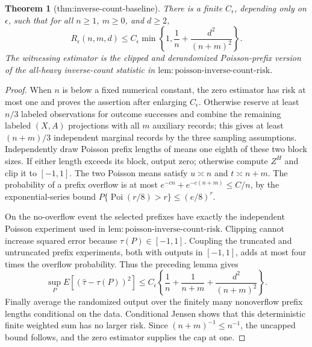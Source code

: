\documentclass{article}
\newtheorem{theorem}{Theorem}
\begin{document}
\begin{theorem}[thm:inverse-count-baseline]\label{thm:inverse-count-baseline}
There is a finite \(C_\epsilon\), depending only on \(\epsilon\), such that for all \(n\ge1\), \(m\ge0\), and \(d\ge2\),
\[
 R_\epsilon(n,m,d)\le C_\epsilon\min\!\left\{1,\frac1n+\frac{d^2}{(n+m)^2}\right\}.
\]
The witnessing estimator is the clipped and derandomized Poisson-prefix version of the all-heavy inverse-count statistic in \(\mathrm{lem:poisson\mbox{-}inverse\mbox{-}count\mbox{-}risk}\).
\end{theorem}
\begin{proof}
When \(n\) is below a fixed numerical constant, the zero estimator has risk at most one and proves the assertion after enlarging \(C_\epsilon\).  Otherwise reserve at least \(n/3\) labeled observations for outcome successes and combine the remaining labeled \((X,A)\) projections with all \(m\) auxiliary records; this gives at least \((n+m)/3\) independent marginal records by the three sampling assumptions.  Independently draw Poisson prefix lengths of means one eighth of these two block sizes.  If either length exceeds its block, output zero; otherwise compute \(Z^H\) and clip it to \([-1,1]\).  The two Poisson means satisfy \(u\asymp n\) and \(t\asymp n+m\).  The probability of a prefix overflow is at most \(e^{-c n}+e^{-c(n+m)}\le C/n\), by the exponential-series bound \(P\{\operatorname{Poi}(r/8)>r\}\le(e/8)^{r}\).

On the no-overflow event the selected prefixes have exactly the independent Poisson experiment used in \(\mathrm{lem:poisson\mbox{-}inverse\mbox{-}count\mbox{-}risk}\).  Clipping cannot increase squared error because \(\tau(P)\in[-1,1]\).  Coupling the truncated and untruncated prefix experiments, both with outputs in \([-1,1]\), adds at most four times the overflow probability.  Thus the preceding lemma gives
\[
 \sup_P E[(\widehat\tau-\tau(P))^2]
 \le C_\epsilon\left\{\frac1n+\frac1{n+m}+\frac{d^2}{(n+m)^2}\right\}.
\]
Finally average the randomized output over the finitely many nonoverflow prefix lengths conditional on the data.  Conditional Jensen shows that this deterministic finite weighted sum has no larger risk.  Since \((n+m)^{-1}\le n^{-1}\), the uncapped bound follows, and the zero estimator supplies the cap at one.
\end{proof}
\end{document}
